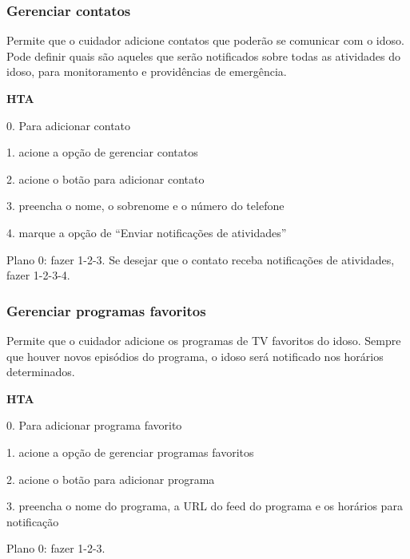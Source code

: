\subsubsection*{Gerenciar contatos}
Permite que o cuidador adicione contatos que poderão se comunicar com o idoso. Pode definir quais são aqueles que serão notificados sobre todas as atividades do idoso, para monitoramento e providências de emergência.

\begin{MyIndentedList}
\item \textbf{HTA}
\item 0. Para adicionar contato
    \begin{MyIndentedList}
        \item 1. acione a opção de gerenciar contatos
        \item 2. acione o botão para adicionar contato
        \item 3. preencha o nome, o sobrenome e o número do telefone
        \item 4. marque a opção de “Enviar notificações de atividades”
    \end{MyIndentedList}
\item Plano 0: fazer 1-2-3. Se desejar que o contato receba notificações de atividades, fazer 1-2-3-4.
\end{MyIndentedList}


\subsubsection*{Gerenciar programas favoritos}
Permite que o cuidador adicione os programas de TV favoritos do idoso. Sempre que houver novos episódios do programa, o idoso será notificado nos horários determinados.

\begin{MyIndentedList}
\item \textbf{HTA}
\item 0. Para adicionar programa favorito
    \begin{MyIndentedList}
        \item 1. acione a opção de gerenciar programas favoritos
        \item 2. acione o botão para adicionar programa
        \item 3. preencha o nome do programa, a URL do feed do programa e os horários para notificação
    \end{MyIndentedList}
\item Plano 0: fazer 1-2-3.
\end{MyIndentedList}


